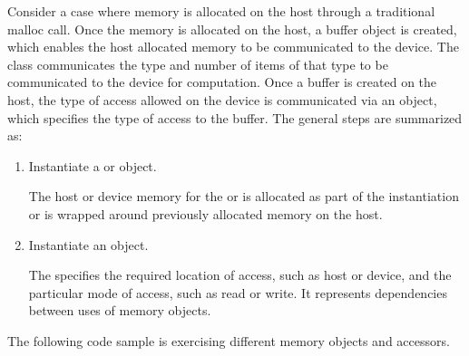 \documentclass[letterpaper,10pt,english]{sphinxmanual}
\begin{document}
Consider a case where memory is allocated on the host through a
traditional malloc call. Once the memory is allocated on the host, a
buffer object is created, which enables the host allocated memory to be
communicated to the device. The  class communicates the type
and number of items of that type to be communicated to the device for
computation. Once a buffer is created on the host, the type of access
allowed on the device is communicated via an  object, which
specifies the type of access to the buffer. The general steps are
summarized as:
\begin{enumerate}
%
\item {} 
Instantiate a  or  object.

The host or device memory for the  or  is
allocated as part of the instantiation or is wrapped around
previously allocated memory on the host.

\item {} 
Instantiate an  object.

The  specifies the required location of access, such as
host or device, and the particular mode of access, such as read or
write. It represents dependencies between uses of memory objects.

\end{enumerate}

The following code sample is exercising different memory objects and
accessors.
\end{document}
